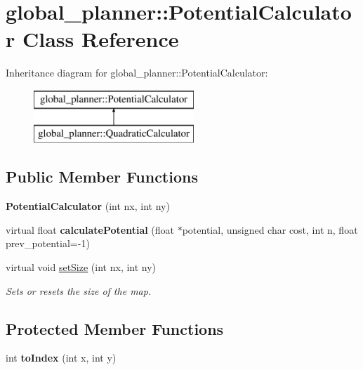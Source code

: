 \hypertarget{classglobal__planner_1_1_potential_calculator}{}\section{global\+\_\+planner\+:\+:Potential\+Calculator Class Reference}
\label{classglobal__planner_1_1_potential_calculator}
Inheritance diagram for global\+\_\+planner\+:\+:Potential\+Calculator\+:\begin{figure}[H]
\begin{center}
\leavevmode
\includegraphics[height=2.000000cm]{classglobal__planner_1_1_potential_calculator}
\end{center}
\end{figure}
\subsection*{Public Member Functions}
\begin{DoxyCompactItemize}
\item 
\mbox{\label{classglobal__planner_1_1_potential_calculator_a9e785461ad18ae3e6a393dedcf903a6a}} 
{\bfseries Potential\+Calculator} (int nx, int ny)
\item 
\mbox{\label{classglobal__planner_1_1_potential_calculator_a4befc4819934603d43c8dc539f445fd4}} 
virtual float {\bfseries calculate\+Potential} (float $\ast$potential, unsigned char cost, int n, float prev\+\_\+potential=-\/1)
\item 
virtual void \mbox{\hyperlink{classglobal__planner_1_1_potential_calculator_a9ff19259198704723eb62d515ea91e58}{set\+Size}} (int nx, int ny)
\begin{DoxyCompactList}\small\item\em Sets or resets the size of the map. \end{DoxyCompactList}\end{DoxyCompactItemize}
\subsection*{Protected Member Functions}
\begin{DoxyCompactItemize}
\item 
\mbox{\label{classglobal__planner_1_1_potential_calculator_a82306cd4356d50c5f9a11b22c7668202}} 
int {\bfseries to\+Index} (int x, int y)
\end{DoxyCompactItemize}
